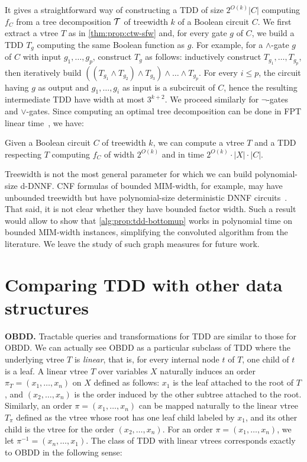 \documentclass[a4paper,UKenglish,cleveref, autoref, thm-restate]{lipics-v2021}
\begin{document}
It gives a straightforward way of constructing a TDD of size $2^{O(k)}|C|$ computing $f_C$ from a tree decomposition $\mathcal{T}$ of treewidth $k$ of a Boolean circuit $C$. We first extract a vtree $T$ as in \cref{thm:prop:ctw-sfw} and, for every gate $g$ of $C$, we build a TDD $T_g$ computing the same Boolean function as $g$. For example, for a $\wedge$-gate $g$ of $C$ with input $g_1,\dots, g_p$, construct $T_g$ as follows: inductively construct $T_{g_1}, \dots, T_{g_p}$, then iteratively build $((T_{g_1} \wedge T_{g_2}) \wedge T_{g_3}) \wedge \dots \wedge T_{g_p}$. For every $i \leq p$, the circuit having $g$ as output and $g_1,\dots, g_i$ as input is a subcircuit of $C$, hence the resulting intermediate TDD have width at most $3^{k+2}$. We proceed similarly for $\neg$-gates and $\vee$-gates.  Since computing an optimal tree decomposition can be done in FPT linear time~\cite{Bodlaender93a}, we have:
\begin{theorem}
\label{thm:tdd:circuit-treewidth}  Given a Boolean circuit $C$ of treewidth $k$, we can compute a vtree $T$ and a TDD respecting $T$ computing $f_C$ of width $2^{O(k)}$ and in time $2^{O(k)} \cdot |X| \cdot |C|$.
\end{theorem}

Treewidth is not the most general parameter for which we can build polynomial-size d-DNNF. CNF formulas of bounded MIM-width, for example, may have unbounded treewidth but have polynomial-size deterministic DNNF circuits~\cite{BovaCMS15,SaetherTV14}. That said, it is not clear whether they have bounded factor width. Such a result would allow to show that \cref{alg:prop:tdd-bottomup} works in polynomial time on bounded MIM-width instances, simplifying the convoluted algorithm from the literature. We leave the study of such graph measures for future work.


\section{Comparing TDD with other data structures}
\label{sec:prop:tdd-vs-rest}

\textbf{OBDD.} Tractable queries and transformations for TDD are similar to those for OBDD. We can actually see OBDD as a particular subclass of TDD where the underlying vtree $T$ is \emph{linear}, that is, for every internal node $t$ of $T$, one child of $t$ is a leaf. A linear vtree $T$ over variables $X$ naturally induces an order $\pi_T = (x_1,\dots,x_n)$ on $X$ defined as follows: $x_1$ is the leaf attached to the root of $T$, and $(x_2,\dots,x_n)$ is the order induced by the other subtree attached to the root. Similarly, an order $\pi = (x_1,\dots,x_n)$ can be mapped naturally to the linear vtree $T_\pi$ defined as the vtree whose root has one leaf child labeled by  $x_1$, and its other child is the vtree for the order $(x_2,\dots,x_n)$. 
%
For an order $\pi=(x_1,\dots,x_n)$, we let $\pi^{-1}=(x_n,\dots,x_1)$. The class of TDD with linear vtrees corresponds exactly to OBDD in the following sense:
\end{document}
